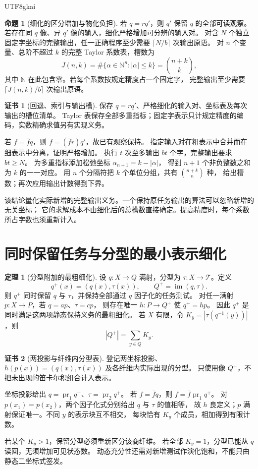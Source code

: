 \documentclass[12pt]{report}
\makeatletter
\theoremstyle{definition}
\newtheorem{theorem}{定理}[chapter]
\newtheorem{proposition}{命题}[chapter]
\newtheorem{Certificate}{证书}[chapter]
\renewenvironment{proof}[1][\proofname]{\par
  \pushQED{\qed}\normalfont
  \topsep6\p@\@plus6\p@\relax
  \trivlist
  \item[\hskip\labelsep\normalfont #1\@addpunct{.}]\ignorespaces
}{
  \popQED\endtrivlist\@endpefalse
}
\newcommand{\NN}{\mathbb N}
\newcommand{\im}{\operatorname{im}}
\makeatother
\begin{document}
\begin{CJK*}{UTF8}{gkai}
\begin{proposition}[细化的区分增加与物化负担]
\label{prop:resolution-burden}
若 \(q=rq'\)，则 \(q'\) 保留 \(q\) 的全部可读观察。
若存在同 \(q\) 像、异 \(q'\) 像的输入，细化严格增加可分辨的输入对。
对含 \(N\) 个独立固定字坐标的完整输出，任一正确程序至少需要
\(\lceil N/b\rceil\) 次输出原语。
对 \(n\) 个变量、总阶不超过 \(k\) 的完整 Taylor 系数表，槽数为
\[
J(n,k)=\#\{\alpha\in\NN^n:|\alpha|\le k\}=\binom{n+k}{k},
\]
其中 \(\NN\) 在此包含零。若每个系数按规定精度占一个固定字，
完整输出至少需要 \(\lceil J(n,k)/b\rceil\) 次输出原语。
\end{proposition}
\begin{Certificate}[回退、索引与输出槽]
保存 \(q=rq'\)、严格细化的输入对、坐标表及每次输出的槽位清单。
Taylor 表保存全部多重指标；固定字表示只计规定精度的编码，实数精确求值另有实现义务。
\end{Certificate}
\begin{proof}
若 \(f=\bar f q\)，则 \(f=(\bar f r)q'\)，故已有观察保持。
指定输入对在粗表示中合并而在细表示中分离，证明严格增加。
执行 \(t\) 次至多输出 \(bt\) 个字，完整输出要求 \(bt\ge N\)。
为多重指标添加松弛坐标 \(\alpha_{n+1}=k-|\alpha|\)，
得到 \(n+1\) 个非负整数之和为 \(k\) 的一一对应。
用 \(n\) 个分隔符把 \(k\) 个单位分组，共有 \(\binom{n+k}{n}\) 种，
给出槽数；再次应用输出计数得到下界。
\end{proof}
该结论量化实际新增的完整输出义务。一个保持原任务输出的算法可以忽略新增的无关坐标；
它的求解成本不由细化后的总槽数直接确定。提高精度时，每个系数所占字数也须重新计入。

\section{同时保留任务与分型的最小表示细化}
\begin{theorem}[分型附加的最粗细化]
\label{thm:joint-typing-refinement}
设 \(q:X\to Q\) 满射，分型为 \(\tau:X\to\mathcal T\)。定义
\[
q^+(x)=(q(x),\tau(x)),\qquad Q^+=\im(q,\tau).
\]
则 \(q^+\) 同时保留 \(q\) 与 \(\tau\)，并保持全部通过 \(q\) 因子化的任务测试。
对任一满射 \(p:X\to P\)，若 \(q=ap\)、\(\tau=cp\)，
则存在唯一 \(h:P\to Q^+\) 使 \(q^+=hp\)。
因此 \(q^+\) 是同时满足这两项静态保持义务的最粗细化。
若 \(X\) 有限，令 \(K_y=|\tau(q^{-1}(y))|\)，则
\[
|Q^+|=\sum_{y\in Q}K_y.
\]
\end{theorem}
\begin{Certificate}[两投影与纤维内分型表]
登记两坐标投影、\(h(p(x))=(q(x),\tau(x))\) 及各纤维内实际出现的分型。
只使用像 \(Q^+\)，不把未出现的笛卡尔积组合计入表示。
\end{Certificate}
\begin{proof}
坐标投影给出 \(q=\operatorname{pr}_1q^+\)、\(\tau=\operatorname{pr}_2q^+\)。
若 \(f=\bar f q\)，则 \(f=\bar f\operatorname{pr}_1q^+\)。
对 \(p(x_1)=p(x_2)\)，两个因子化式分别给出 \(q\) 与 \(\tau\) 的值相等，
故 \(h\) 良定义；\(p\) 满射保证唯一。不同 \(y\) 的表示块互不相交，
每块恰有 \(K_y\) 个成员，相加得到有限计数。
\end{proof}
若某个 \(K_y>1\)，保留分型必须重新区分该商纤维。
若全部 \(K_y=1\)，分型已能从 \(q\) 读回，无须增加可见状态数。
动态充分性还需对新增测试作演化饱和，不能只由静态二坐标式签发。


\end{CJK*}
\end{document}
